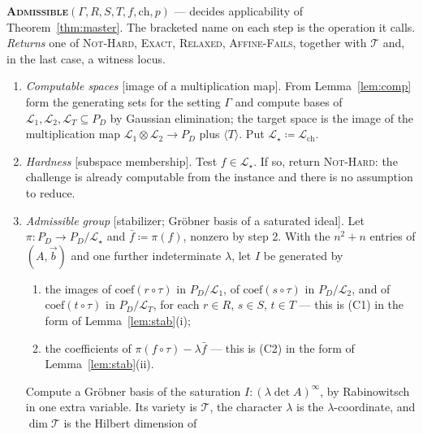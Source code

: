 \documentclass{conjura-solution}
\newcommand{\vb}{\vec{b}}
\newcommand{\LL}{\mathcal{L}}
\newcommand{\Span}[1]{\langle #1 \rangle} %
\newcommand{\ch}{\mathrm{ch}}
\begin{document}
\begin{procedurebox}
\textbf{\textsc{Admissible}}$(\Gamma,R,S,T,f,\ch,p)$ --- decides applicability of
Theorem~\ref{thm:master}. The bracketed name on each step is the operation it calls.\\[2pt]
\emph{Returns} one of \textsc{Not-Hard}, \textsc{Exact}, \textsc{Relaxed},
\textsc{Affine-Fails}, together with $\mathcal T$ and, in the last case, a witness locus.
\begin{enumerate}[label=\textup{\arabic*.},leftmargin=2.2em,itemsep=3pt]
  \item \emph{Computable spaces} \textup{[image of a multiplication map]}. From
        Lemma~\ref{lem:comp} form the generating sets for the setting $\Gamma$ and compute bases
        of $\LL_1,\LL_2,\LL_T\subseteq P_D$ by Gaussian elimination; the target space is the
        image of the multiplication map $\LL_1\otimes\LL_2\to P_D$ plus $\Span{T}$. Put
        $\LL_\star\coloneqq\LL_{\ch}$.
  \item \emph{Hardness} \textup{[subspace membership]}. Test $f\in\LL_\star$. If so, return
        \textsc{Not-Hard}: the challenge is already computable from the instance and there is
        no assumption to reduce.
  \item \emph{Admissible group} \textup{[stabilizer; Gr\"obner basis of a saturated ideal]}. Let
        $\pi\colon P_D\to P_D/\LL_\star$ and $\bar f\coloneqq\pi(f)$, nonzero by step 2. With
        the $n^{2}+n$ entries of $(A,\vb)$ and one further indeterminate $\lambda$, let $I$ be
        generated by
        \begin{enumerate}[label=\textup{(\alph*)},leftmargin=2.2em,topsep=2pt,itemsep=1pt]
          \item the images of $\mathrm{coef}(r\circ\tau)$ in $P_D/\LL_1$, of
                $\mathrm{coef}(s\circ\tau)$ in $P_D/\LL_2$, and of $\mathrm{coef}(t\circ\tau)$
                in $P_D/\LL_T$, for each $r\in R$, $s\in S$, $t\in T$ --- this is
                \textup{(C1)} in the form of Lemma~\ref{lem:stab}(i);
          \item the coefficients of $\pi(f\circ\tau)-\lambda\bar f$ --- this is \textup{(C2)}
                in the form of Lemma~\ref{lem:stab}(ii).
        \end{enumerate}
        Compute a Gr\"obner basis of the saturation $I:(\lambda\det A)^{\infty}$, by
        Rabinowitsch in one extra variable. Its variety is $\mathcal T$, the character
        $\lambda$ is the $\lambda$-coordinate, and $\dim\mathcal T$ is the Hilbert dimension of

\end{enumerate}
\end{procedurebox}
\end{document}
